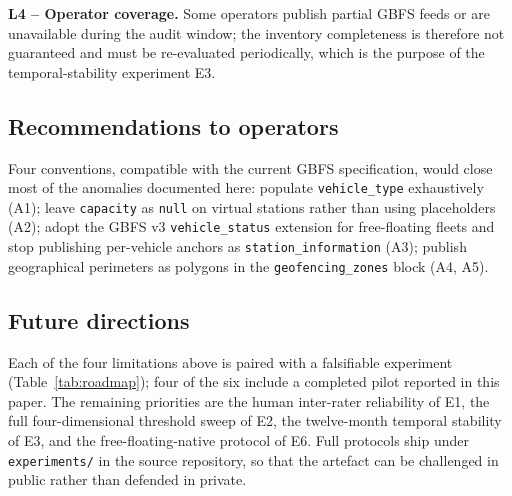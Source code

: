 \documentclass[11pt,a4paper]{article}
\begin{document}
\textbf{L4 -- Operator coverage.} Some operators publish partial GBFS
feeds or are unavailable during the audit window; the inventory
completeness is therefore not guaranteed and must be re-evaluated
periodically, which is the purpose of the temporal-stability
experiment E3.

\subsection{Recommendations to operators}
Four conventions, compatible with the current GBFS specification,
would close most of the anomalies documented here: populate
\texttt{vehicle\_type} exhaustively (A1); leave \texttt{capacity}
as \texttt{null} on virtual stations rather than using placeholders
(A2); adopt the GBFS v3 \texttt{vehicle\_status} extension for
free-floating fleets and stop publishing per-vehicle anchors as
\texttt{station\_information} (A3); publish geographical perimeters
as polygons in the \texttt{geofencing\_zones} block (A4, A5).

\subsection{Future directions}
Each of the four limitations above is paired with a falsifiable
experiment (Table~\ref{tab:roadmap}); four of the six include a
completed pilot reported in this paper. The remaining priorities are
the human inter-rater reliability of E1, the full four-dimensional
threshold sweep of E2, the twelve-month temporal stability of E3,
and the free-floating-native protocol of E6. Full protocols ship
under \texttt{experiments/} in the source repository, so that the
artefact can be challenged in public rather than defended in
private.
\end{document}
